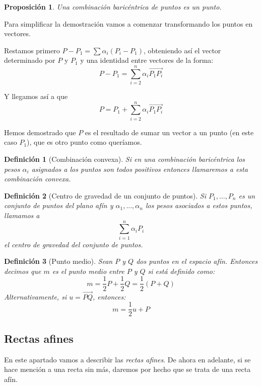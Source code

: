 \documentclass[11pt, a4paper, titlepage]{article}
\makeatletter
\renewenvironment{proof}[1][\proofname] {\vspace{-15pt}\par\pushQED{\qed}\normalfont\topsep6\p@\@plus6\p@\relax\trivlist\item[\hskip\labelsep\it#1\@addpunct{.}]\ignorespaces}{\popQED\endtrivlist\@endpefalse}
\theoremstyle{theorem-style}
\newtheorem*{nprop}{Proposición}
\theoremstyle{definition-style}
\newtheorem*{ndef}{Definición}
\theoremstyle{remark-style}
\theoremstyle{example-style}
\makeatother
\begin{document}
\begin{nprop} Una combinación baricéntrica de puntos es un punto. 
\end{nprop}

\begin{proof}

  Para simplificar la demostración vamos a comenzar transformando los puntos en vectores.

  Restamos primero $P-P_1 = \sum \alpha_i(P_i-P_1)$, obteniendo así el vector determinado por $P$ y $P_1$ y una identidad entre vectores de la forma:
  \[
    P-P_1 = \sum_{i=2}^n \alpha_i \overrightarrow{P_1P_i}
  \]

  Y llegamos así a que
  \[
    P = P_1 + \sum_{i=2}^n \alpha_i \overrightarrow{P_1P_i}
  \]
  
  Hemos demostrado que $P$ es el resultado de sumar un vector a un punto (en este caso $P_1$), que es otro punto como queríamos.
\end{proof}

\begin{ndef}[Combinación convexa]
  Si en una combinación baricéntrica los pesos $\alpha_i$ asignados a los puntos son todos positivos entonces llamaremos a esta combinación \textit{convexa}. \end{ndef}

\begin{ndef}[Centro de gravedad de un conjunto de puntos]
  Si $P_1,...,P_n$ es un conjunto de puntos del plano afín y $\alpha_1,...,\alpha_n$ los \textit{pesos} asociados a estos puntos, llamamos a
  \[
    \sum_{i=1}^n \alpha_iP_i
  \]
  el \textit{centro de gravedad del conjunto de puntos}.
\end{ndef}

\begin{ndef}[Punto medio]
  Sean $P$ y $Q$ dos puntos en el espacio afín. Entonces decimos que $m$ es el punto medio entre $P$ y $Q$ si está definido como:
  \[
    m = \dfrac{1}{2} P + \dfrac{1}{2}Q = \dfrac{1}{2}(P+Q)
  \]
  Alternativamente, si $u = \overrightarrow{PQ}$, entonces:
  \[
    m = \dfrac{1}{2}u + P
  \]

\end{ndef}

\subsection{Rectas afines}

En este apartado vamos a describir las \textit{rectas afines}. De ahora en adelante, si se hace mención a una recta sin más, daremos por hecho que se trata de una recta afín.
\end{document}
